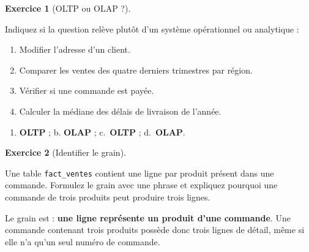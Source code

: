 \documentclass[
  french,
  letterpaper,
  open=any]{scrbook}
\providecommand{\tightlist}{%
  \setlength{\itemsep}{0pt}\setlength{\parskip}{0pt}}
\theoremstyle{definition}
\theoremstyle{definition}
\newtheorem{exercise}{Exercice}[section]
\theoremstyle{remark}
\begin{document}
\begin{exercise}[OLTP ou OLAP
?]\protect\hypertarget{exr-dwh-1}{}\label{exr-dwh-1}

Indiquez si la question relève plutôt d'un système opérationnel ou
analytique :

\begin{enumerate}
\def\labelenumi{\alph{enumi}.}
\tightlist
\item
  Modifier l'adresse d'un client.
\item
  Comparer les ventes des quatre derniers trimestres par région.
\item
  Vérifier si une commande est payée.
\item
  Calculer la médiane des délais de livraison de l'année.
\end{enumerate}

\end{exercise}

\begin{tcolorbox}[enhanced jigsaw, arc=.35mm, bottomrule=.15mm, bottomtitle=1mm, breakable, colback=white, colbacktitle=quarto-callout-tip-color!10!white, colframe=quarto-callout-tip-color-frame, coltitle=black, left=2mm, leftrule=.75mm, opacityback=0, opacitybacktitle=0.6, rightrule=.15mm, title=\textcolor{quarto-callout-tip-color}{\faLightbulb}\hspace{0.5em}{Solution de l'exercice Exercice~\ref{exr-dwh-1}}, titlerule=0mm, toprule=.15mm, toptitle=1mm]

\begin{enumerate}
\def\labelenumi{\alph{enumi}.}
\tightlist
\item
  \textbf{OLTP} ; b. \textbf{OLAP} ; c.~\textbf{OLTP} ;
  d.~\textbf{OLAP}.
\end{enumerate}

\end{tcolorbox}

\begin{exercise}[Identifier le
grain]\protect\hypertarget{exr-dwh-2}{}\label{exr-dwh-2}

Une table \texttt{fact\_ventes} contient une ligne par produit présent
dans une commande. Formulez le grain avec une phrase et expliquez
pourquoi une commande de trois produits peut produire trois lignes.

\end{exercise}

\begin{tcolorbox}[enhanced jigsaw, arc=.35mm, bottomrule=.15mm, bottomtitle=1mm, breakable, colback=white, colbacktitle=quarto-callout-tip-color!10!white, colframe=quarto-callout-tip-color-frame, coltitle=black, left=2mm, leftrule=.75mm, opacityback=0, opacitybacktitle=0.6, rightrule=.15mm, title=\textcolor{quarto-callout-tip-color}{\faLightbulb}\hspace{0.5em}{Solution de l'exercice Exercice~\ref{exr-dwh-2}}, titlerule=0mm, toprule=.15mm, toptitle=1mm]

Le grain est : \textbf{une ligne représente un produit d'une commande}.
Une commande contenant trois produits possède donc trois lignes de
détail, même si elle n'a qu'un seul numéro de commande.

\end{tcolorbox}
\end{document}
